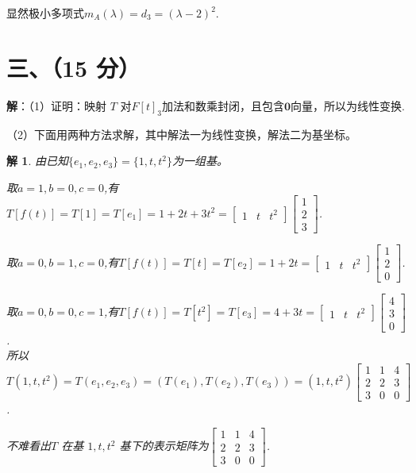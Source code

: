 \documentclass[11pt, a4paper]{article}
\newtheorem{solve}{解}
\begin{document}
显然极小多项式$m_A(\lambda) = d_3 = (\lambda-2)^2$.




\section*{三、（15 分）}

\textbf{解}：（1）证明：映射 $T$ 对$F[t]_3$加法和数乘封闭，且包含$\mathbf{0}$向量，所以为线性变换.


（2）下面用两种方法求解，其中解法一为线性变换，解法二为基坐标。

\begin{solve}由已知$\{e_1, e_2, e_3\}=\{1, t, t^2\}$为一组基。

取$a=1, b=0, c=0$,有$T[f(t)]=T[1]=T[e_1]=1+2t+3t^2=
\begin{bmatrix}1&t&t^2\end{bmatrix}\begin{bmatrix}1\\2\\3\end{bmatrix}$.

取$a=0, b=1, c=0$,有$T[f(t)]=T[t]=T[e_2]=1+2t=
\begin{bmatrix}1&t&t^2\end{bmatrix}\begin{bmatrix}1\\2\\0\end{bmatrix}$.

取$a=0, b=0, c=1$,有$T[f(t)]=T[t^2]=T[e_3]=4+3t=
\begin{bmatrix}1&t&t^2\end{bmatrix}\begin{bmatrix}4\\3\\0\end{bmatrix}$.\\

所以$T(1, t, t^2) = T(e_1, e_2, e_3) =\left( T(e_1), T(e_2), T(e_3)\right)=(1, t, t^2)\begin{bmatrix}1&1&4\\2&2&3\\3&0&0\end{bmatrix}$.

不难看出$T$ 在基 $1, t, t^2$ 基下的表示矩阵为$\begin{bmatrix}1&1&4\\2&2&3\\3&0&0\end{bmatrix}$.
\end{solve}
\end{document}
